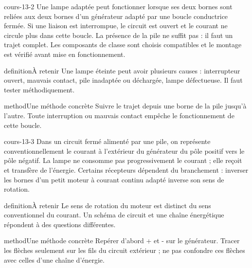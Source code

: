 \documentclass[12pt,twoside,openany]{book}
\begin{document}
\begin{pcFiche}{cours-13-2}
Une lampe adaptée peut fonctionner lorsque ses deux bornes sont reliées aux deux bornes d’un générateur adapté par une boucle conductrice fermée. Si une liaison est interrompue, le circuit est ouvert et le courant ne circule plus dans cette boucle. La présence de la pile ne suffit pas : il faut un trajet complet. Les composants de classe sont choisis compatibles et le montage est vérifié avant mise en fonctionnement.\par
{}
\begin{pcEncadre}{definition}{À retenir}
Une lampe éteinte peut avoir plusieurs causes : interrupteur ouvert, mauvais contact, pile inadaptée ou déchargée, lampe défectueuse. Il faut tester méthodiquement.\par
\end{pcEncadre}
\begin{pcEncadre}{method}{Une méthode concrète}
Suivre le trajet depuis une borne de la pile jusqu’à l’autre. Toute interruption ou mauvais contact empêche le fonctionnement de cette boucle.\par
\end{pcEncadre}
\end{pcFiche}
\label{ch-13-cours-3}
\begin{pcFiche}{cours-13-3}
Dans un circuit fermé alimenté par une pile, on représente conventionnellement le courant à l’extérieur du générateur du pôle positif vers le pôle négatif. La lampe ne consomme pas progressivement le courant ; elle reçoit et transfère de l’énergie. Certains récepteurs dépendent du branchement : inverser les bornes d’un petit moteur à courant continu adapté inverse son sens de rotation.\par
{}
\begin{pcEncadre}{definition}{À retenir}
Le sens de rotation du moteur est distinct du sens conventionnel du courant. Un schéma de circuit et une chaîne énergétique répondent à des questions différentes.\par
\end{pcEncadre}
\begin{pcEncadre}{method}{Une méthode concrète}
Repérer d’abord + et - sur le générateur. Tracer les flèches seulement sur les fils du circuit extérieur ; ne pas confondre ces flèches avec celles d’une chaîne d’énergie.\par
\end{pcEncadre}
\end{pcFiche}
\end{document}
